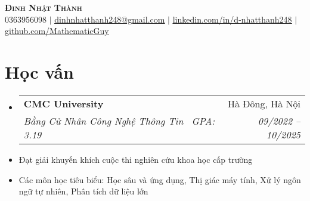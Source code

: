 \documentclass[letterpaper,11pt]{article}
\makeatletter
\newcommand{\resumeItem}[1]{
	\item\small{
	{#1 \vspace{-2pt}}
	}
}
\newcommand{\resumeSubheading}[4]{
	\vspace{-2pt}\item
	\begin{tabular*}{0.97\textwidth}[t]{l@{\extracolsep{\fill}}r}
		\textbf{#1} & #2 \\
		\textit{\small#3} & \textit{\small #4} \\
	\end{tabular*}\vspace{-7pt}
}
\newcommand{\resumeSubHeadingListStart}{\begin{itemize}[leftmargin=0.15in, label={}]}
\newcommand{\resumeSubHeadingListEnd}{\end{itemize}}
\makeatother
\begin{document}

\begin{center}
    \textbf{\Huge \scshape Đinh Nhật Thành} \\ \vspace{1pt}
    \small 0363956098 $|$ \href{mailto:x@x.com}{\underline{dinhnhatthanh248@gmail.com}} $|$
    \href{https://linkedin.com/in/...}{\underline{linkedin.com/in/d-nhatthanh248}} $|$
    \href{https://github.com/...}{\underline{github.com/MathematicGuy}}
\end{center}


\section{Học vấn}
	\resumeSubHeadingListStart
	\resumeSubheading
		{CMC University} {Hà Đông, Hà Nội}
		{Bằng Cử Nhân Công Nghệ Thông Tin \textbar \ GPA: 3.19}{09/2022 -- 10/2025}
		\resumeItem{Đạt giải khuyến khích cuộc thi nghiên cứu khoa học cấp trường}
		\resumeItem{Các môn học tiêu biểu: Học sâu và ứng dụng, Thị giác máy tính, Xử lý ngôn ngữ tự nhiên, Phân tích dữ liệu lớn}
	\resumeSubHeadingListEnd

\end{document}
